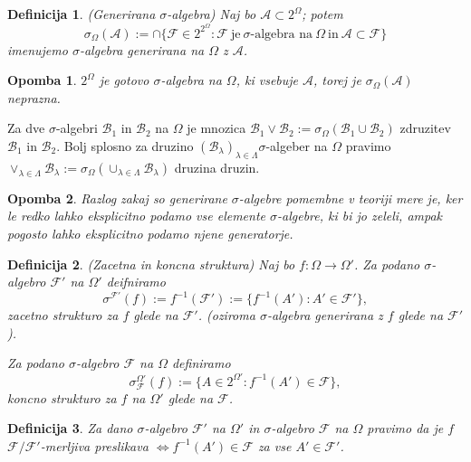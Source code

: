 \documentclass[a4paper,12pt]{article}
\newtheorem{definicija}{Definicija}
\newtheorem{opomba}{Opomba}
\newcommand{\F}{\mathcal{F}}
\newcommand{\A}{\mathcal{A}}
\begin{document}
            \begin{definicija}(Generirana $\sigma$-algebra)
                Naj bo $\A \subset 2^\Omega$; potem $$\sigma_\Omega(\A):=\cap\{\F \in 2^{2^\Omega}: \F \ \text{je} \ \sigma\text{-algebra na} \ \Omega \ \text{in} \ \A \subset \F \}$$ imenujemo $\sigma$-algebra generirana na $\Omega$ z $\A$.
            \end{definicija}

            \begin{opomba}
                $2^\Omega$ je gotovo $\sigma$-algebra na $\Omega$, ki vsebuje $\A$, torej je $\sigma_\Omega(\A)$ neprazna.
            \end{opomba}

            Za dve $\sigma$-algebri $\mathcal{B}_1$ in $\mathcal{B}_2$ na $\Omega$ je mnozica $\mathcal{B}_1 \vee \mathcal{B}_2 := \sigma_\Omega\left(\mathcal{B}_1 \cup \mathcal{B}_2\right)$ zdruzitev $\mathcal{B}_1$ in $\mathcal{B}_2$. Bolj splosno
            za druzino $\left(\mathcal{B}_\lambda\right)_{\lambda \in \Lambda} \sigma$-algeber na $\Omega$ pravimo $\vee_{\lambda \in \Lambda}\mathcal{B}_\lambda := \sigma_\Omega\left(\cup_{\lambda \in \Lambda}\mathcal{B}_\lambda\right)$ druzina druzin.

            \begin{opomba}
                Razlog zakaj so generirane $\sigma$-algebre pomembne v teoriji mere je, ker le redko lahko eksplicitno
                podamo vse elemente $\sigma$-algebre, ki bi jo zeleli, ampak pogosto lahko eksplicitno podamo njene generatorje.  
            \end{opomba}

            \begin{definicija}(Zacetna in koncna struktura)
                Naj bo $f:\Omega \rightarrow \Omega'$. Za podano $\sigma$-algebro $\F'$ na $\Omega'$  deifniramo $$\sigma^{\F'}(f):= f^{-1}(\F'):=\{f^{-1}(A'):A' \in \F'\},$$
                zacetno strukturo za $f$ glede na $\F'$. (oziroma $\sigma$-algebra generirana z $f$ glede na $\F'$).

                Za podano $\sigma$-algebro $\F$ na $\Omega$ definiramo $$\sigma^{\Omega'}_{\F}(f):=\{A \in 2^{\Omega'}: f^{-1}(A') \in \F\},$$
                koncno strukturo za $f$ na $\Omega'$ glede na $\F$.
            \end{definicija}

            \begin{definicija}
                Za dano $\sigma$-algebro $\F'$ na $\Omega'$ in $\sigma$-algebro $\F$ na $\Omega$ pravimo da je $f$ $\F/\F'$-merljiva preslikava $\iff f^{-1}(A')\in \F$ za vse $A' \in \F'$.
            \end{definicija}
\end{document}
